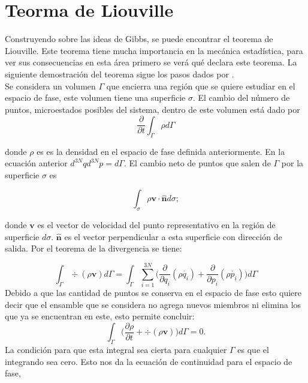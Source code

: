 \section{Teorma de Liouville }
Construyendo sobre las ideas de Gibbs, se puede encontrar el teorema de Liouville. Este teorema tiene mucha importancia en la mecánica estadística, para ver sus consecuencias en esta área primero se verá qué declara este teorema. La siguiente demostración del teorema sigue los pasos dados por \cite{PathriaStat}. 
\\
Se considera un volumen $\Gamma$ que encierra una región que se quiere estudiar en el espacio de fase,  este volumen tiene una superficie $\sigma$. El cambio del número de puntos, microestados posibles del sistema, dentro de este volumen está dado por 
\begin{equation}
\frac{\partial}{\partial t} \int_{\Gamma} \rho d\Gamma
\end{equation}

donde $\rho$ es es la densidad en el espacio de fase definida anteriormente. En la ecuación anterior $d^{3N}q d^{3N}p=d\Gamma$. 
El cambio neto de puntos que salen de $\Gamma$ por la superficie $\sigma$ es

\begin{equation}
\int_{\sigma} \rho \mathbf{v \cdot \hat{n}} d\sigma;
\end{equation}

donde $\mathbf{v}$ es el vector de velocidad del punto representativo en la región de superficie $d\sigma$. $\mathbf{\hat{n}}$ es el vector perpendicular a esta superficie con dirección de salida. Por el teorema de la divergencia se tiene:

\begin{equation}
\int_{\Gamma} \div{ ( \rho\mathbf{v} ) } d\Gamma = \int_{\Gamma} \sum_{i=1}^{3N} \Big( \frac{\partial}{\partial q_{i}}(\rho \dot{q_{i}})+ \frac{\partial}{\partial p_{i}} (\rho \dot{p_{i}}) \Big) d\Gamma
\end{equation}
Debido a que las cantidad de puntos se conserva en el espacio de fase esto quiere decir que el ensamble que se considera no agrega nuevos miembros ni elimina los que ya se encuentran en este, esto permite concluir:
\begin{equation}
 \int_{\Gamma} \Big( \frac{\partial \rho}{\partial t} + \div{ ( \rho\mathbf{v} ) } \Big) d\Gamma =0.
\end{equation}
La condición para que esta integral sea cierta para cualquier $\Gamma$ es que el integrando sea cero. Esto nos da la ecuación de continuidad para el espacio de fase,


